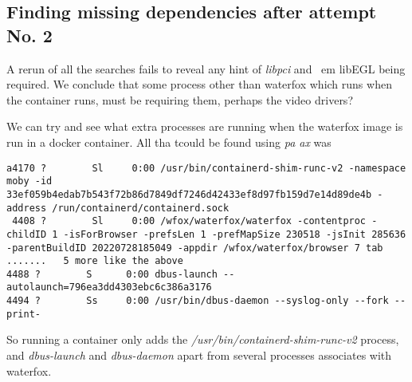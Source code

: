 \documentclass[a4paper]{article}  %
\begin{document}
\subsection{Finding missing dependencies after attempt No. 2}

A rerun of all the searches fails to reveal any hint of {\em libpci} and {\
em libEGL} being required. We conclude that some process other than waterfox which runs when the container runs, must be requiring them, perhaps the video drivers?

We can try and see what extra processes are running when the waterfox image is run in a docker container. All tha tcould be found using {\em pa ax} was
\begin{tcolorbox}
\begin{verbatim}
a4170 ?        Sl     0:00 /usr/bin/containerd-shim-runc-v2 -namespace moby -id 33ef059b4edab7b543f72b86d7849df7246d42433ef8d97fb159d7e14d89de4b -address /run/containerd/containerd.sock
 4408 ?        Sl     0:00 /wfox/waterfox/waterfox -contentproc -childID 1 -isForBrowser -prefsLen 1 -prefMapSize 230518 -jsInit 285636 -parentBuildID 20220728185049 -appdir /wfox/waterfox/browser 7 tab
.......   5 more like the above
4488 ?        S      0:00 dbus-launch --autolaunch=796ea3dd4303ebc6c386a3176
4494 ?        Ss     0:00 /usr/bin/dbus-daemon --syslog-only --fork --print-
\end{verbatim}
\end{tcolorbox}
 So running a container only adds the {\em /usr/bin/containerd-shim-runc-v2} process, and {\em dbus-launch} and {\em dbus-daemon} apart from several processes associates with waterfox.
\end{document}
